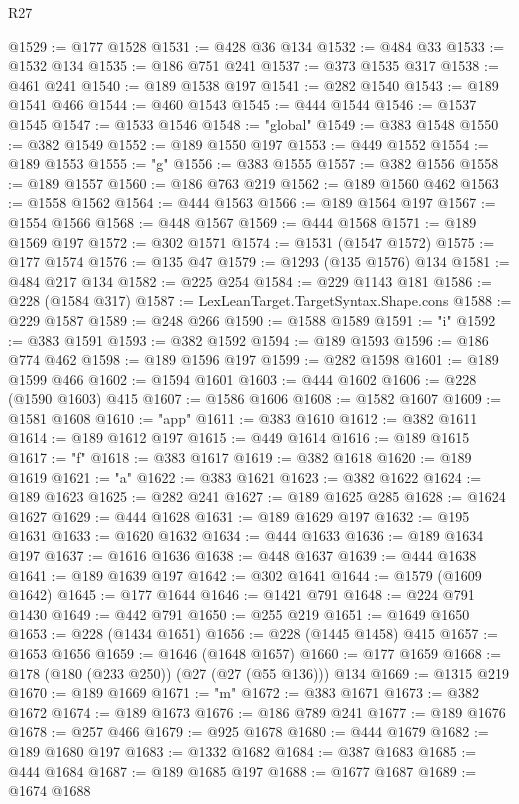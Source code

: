 \begin{lexlean}{R27}
\begin{coremodule}
@1529 := @177 @1528
@1531 := @428 @36 @134
@1532 := @484 @33
@1533 := @1532 @134
@1535 := @186 @751 @241
@1537 := @373 @1535 @317
@1538 := @461 @241
@1540 := @189 @1538 @197
@1541 := @282 @1540
@1543 := @189 @1541 @466
@1544 := @460 @1543
@1545 := @444 @1544
@1546 := @1537 @1545
@1547 := @1533 @1546
@1548 := "global"
@1549 := @383 @1548
@1550 := @382 @1549
@1552 := @189 @1550 @197
@1553 := @449 @1552
@1554 := @189 @1553
@1555 := "g"
@1556 := @383 @1555
@1557 := @382 @1556
@1558 := @189 @1557
@1560 := @186 @763 @219
@1562 := @189 @1560 @462
@1563 := @1558 @1562
@1564 := @444 @1563
@1566 := @189 @1564 @197
@1567 := @1554 @1566
@1568 := @448 @1567
@1569 := @444 @1568
@1571 := @189 @1569 @197
@1572 := @302 @1571
@1574 := @1531 (@1547 @1572)
@1575 := @177 @1574
@1576 := @135 @47
@1579 := @1293 (@135 @1576) @134
@1581 := @484 @217 @134
@1582 := @225 @254
@1584 := @229 @1143 @181
@1586 := @228 (@1584 @317)
@1587 := LexLeanTarget.TargetSyntax.Shape.cons
@1588 := @229 @1587
@1589 := @248 @266
@1590 := @1588 @1589
@1591 := "i"
@1592 := @383 @1591
@1593 := @382 @1592
@1594 := @189 @1593
@1596 := @186 @774 @462
@1598 := @189 @1596 @197
@1599 := @282 @1598
@1601 := @189 @1599 @466
@1602 := @1594 @1601
@1603 := @444 @1602
@1606 := @228 (@1590 @1603) @415
@1607 := @1586 @1606
@1608 := @1582 @1607
@1609 := @1581 @1608
@1610 := "app"
@1611 := @383 @1610
@1612 := @382 @1611
@1614 := @189 @1612 @197
@1615 := @449 @1614
@1616 := @189 @1615
@1617 := "f"
@1618 := @383 @1617
@1619 := @382 @1618
@1620 := @189 @1619
@1621 := "a"
@1622 := @383 @1621
@1623 := @382 @1622
@1624 := @189 @1623
@1625 := @282 @241
@1627 := @189 @1625 @285
@1628 := @1624 @1627
@1629 := @444 @1628
@1631 := @189 @1629 @197
@1632 := @195 @1631
@1633 := @1620 @1632
@1634 := @444 @1633
@1636 := @189 @1634 @197
@1637 := @1616 @1636
@1638 := @448 @1637
@1639 := @444 @1638
@1641 := @189 @1639 @197
@1642 := @302 @1641
@1644 := @1579 (@1609 @1642)
@1645 := @177 @1644
@1646 := @1421 @791
@1648 := @224 @791 @1430
@1649 := @442 @791
@1650 := @255 @219
@1651 := @1649 @1650
@1653 := @228 (@1434 @1651)
@1656 := @228 (@1445 @1458) @415
@1657 := @1653 @1656
@1659 := @1646 (@1648 @1657)
@1660 := @177 @1659
@1668 := @178 (@180 (@233 @250)) (@27 (@27 (@55 @136))) @134
@1669 := @1315 @219
@1670 := @189 @1669
@1671 := "m"
@1672 := @383 @1671
@1673 := @382 @1672
@1674 := @189 @1673
@1676 := @186 @789 @241
@1677 := @189 @1676
@1678 := @257 @466
@1679 := @925 @1678
@1680 := @444 @1679
@1682 := @189 @1680 @197
@1683 := @1332 @1682
@1684 := @387 @1683
@1685 := @444 @1684
@1687 := @189 @1685 @197
@1688 := @1677 @1687
@1689 := @1674 @1688

\end{coremodule}
\end{lexlean}
